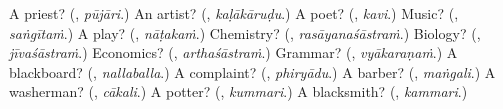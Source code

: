 \begin{tcolorbox}[breakable,colback=teal!4,colframe=teal!35!black,title={Before you move on}]
A priest? (\textbf{}, \emph{pūjāri}.) An artist? (\textbf{}, \emph{kaḷākāruḍu}.) A poet? (\textbf{}, \emph{kavi}.) Music? (\textbf{}, \emph{saṅgītaṁ}.) A play? (\textbf{}, \emph{nāṭakaṁ}.) Chemistry? (\textbf{}, \emph{rasāyanaśāstraṁ}.) Biology? (\textbf{}, \emph{jīvaśāstraṁ}.) Economics? (\textbf{}, \emph{arthaśāstraṁ}.) Grammar? (\textbf{}, \emph{vyākaraṇaṁ}.) A blackboard? (\textbf{}, \emph{nallaballa}.) A complaint? (\textbf{}, \emph{phiryādu}.) A barber? (\textbf{}, \emph{maṅgali}.) A washerman? (\textbf{}, \emph{cākali}.) A potter? (\textbf{}, \emph{kummari}.) A blacksmith? (\textbf{}, \emph{kammari}.)
\end{tcolorbox}
